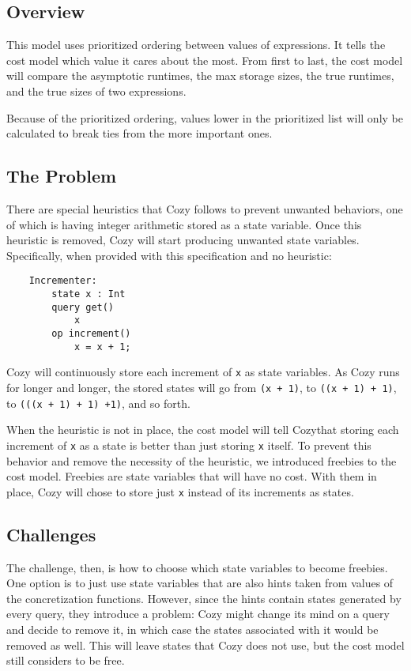 \newcommand{\code}[1]{\texttt{#1}}

\subsection{Overview}
This model uses prioritized ordering between values of expressions. It tells the
cost model which value it cares about the most. From first to last, the cost
model will compare the asymptotic runtimes, the max storage sizes, the true
runtimes, and the true sizes of two expressions.

Because of the prioritized ordering, values lower in the prioritized list will
only be calculated to break ties from the more important ones.

\subsection{The Problem}
There are special heuristics that Cozy follows to prevent unwanted behaviors,
one of which is having integer arithmetic stored as a state variable. Once this
heuristic is removed, Cozy will start producing unwanted state variables.
Specifically, when provided with this specification and no heuristic:

\begin{center}
\begin{lstlisting}
    Incrementer:
        state x : Int
        query get()
            x
        op increment()
            x = x + 1;
\end{lstlisting}
\end{center}

Cozy will continuously store each increment of \code{x} as state variables. As
Cozy runs for longer and longer, the stored states will go from \code{(x + 1)},
to \code{((x + 1) + 1)}, to \code{(((x + 1) + 1) +1)}, and so forth.

When the heuristic is not in place, the cost model will tell Cozythat storing
each increment of \code{x} as a state is better than just storing \code{x}
itself. To prevent this behavior and remove the necessity of the heuristic, we
introduced freebies to the cost model. Freebies are state variables that will
have no cost. With them in place, Cozy will chose to store just \code{x} instead
of its increments as states.

\subsection{Challenges}
The challenge, then, is how to choose which state variables to become freebies.
One option is to just use state variables that are also hints taken from values
of the concretization functions. However, since the hints contain states
generated by every query, they introduce a problem: Cozy might change its mind
on a query and decide to remove it, in which case the states associated with it
would be removed as well. This will leave states that Cozy does not use, but the
cost model still considers to be free.

